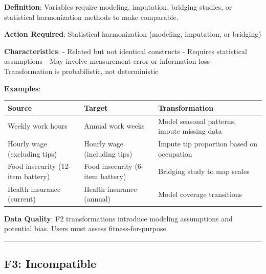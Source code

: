 \documentclass[
  letterpaper,
]{report}
\begin{document}
\textbf{Definition}: Variables require modeling, imputation, bridging
studies, or statistical harmonization methods to make comparable.

\textbf{Action Required}: Statistical harmonization (modeling,
imputation, or bridging)

\textbf{Characteristics}: - Related but not identical constructs -
Requires statistical assumptions - May involve measurement error or
information loss - Transformation is probabilistic, not deterministic

\textbf{Examples}:

\begin{longtable}[]{@{}
  >{\raggedright\arraybackslash}p{}
  >{\raggedright\arraybackslash}p{}
  >{\raggedright\arraybackslash}p{}@{}}
\toprule\noalign{}
\begin{minipage}[b]{\linewidth}\raggedright
Source
\end{minipage} & \begin{minipage}[b]{\linewidth}\raggedright
Target
\end{minipage} & \begin{minipage}[b]{\linewidth}\raggedright
Transformation
\end{minipage} \\
\midrule\noalign{}
\endhead
\bottomrule\noalign{}
\endlastfoot
Weekly work hours & Annual work weeks & Model seasonal patterns, impute
missing data \\
Hourly wage (excluding tips) & Hourly wage (including tips) & Impute tip
proportion based on occupation \\
Food insecurity (12-item battery) & Food insecurity (6-item battery) &
Bridging study to map scales \\
Health insurance (current) & Health insurance (annual) & Model coverage
transitions \\
\end{longtable}

\textbf{Data Quality}: F2 transformations introduce modeling assumptions
and potential bias. Users must assess fitness-for-purpose.

\begin{center}\rule{0.5\linewidth}{0.5pt}\end{center}

\subsection{F3: Incompatible}\label{f3-incompatible}
\end{document}
